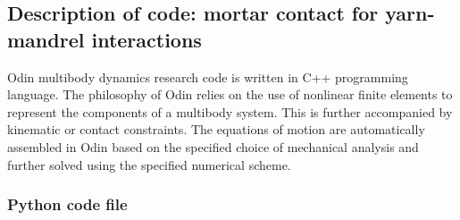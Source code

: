 \subsection{Description of code: mortar contact for yarn-mandrel interactions}
Odin multibody dynamics research code \cite{odin2022} is written in C++ programming language. The philosophy of Odin relies on the use of nonlinear finite elements to represent the components of a multibody system. This is further accompanied by kinematic or contact constraints. The equations of motion are automatically assembled in Odin based on the specified choice of mechanical analysis and further solved using the specified numerical scheme.\\

\subsubsection{Python code file} 
